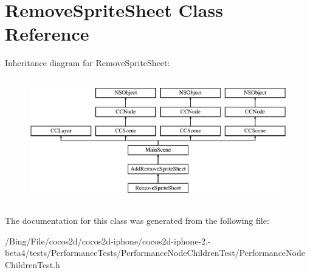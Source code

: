 \hypertarget{interface_remove_sprite_sheet}{\section{Remove\-Sprite\-Sheet Class Reference}
\label{interface_remove_sprite_sheet}
}
Inheritance diagram for Remove\-Sprite\-Sheet\-:\begin{figure}[H]
\begin{center}
\leavevmode
\includegraphics[height=5.490196cm]{interface_remove_sprite_sheet}
\end{center}
\end{figure}


The documentation for this class was generated from the following file\-:\begin{DoxyCompactItemize}
\item 
/\-Bing/\-File/cocos2d/cocos2d-\/iphone/cocos2d-\/iphone-\/2.-\/beta4/tests/\-Performance\-Tests/\-Performance\-Node\-Children\-Test/Performance\-Node\-Children\-Test.\-h\end{DoxyCompactItemize}
